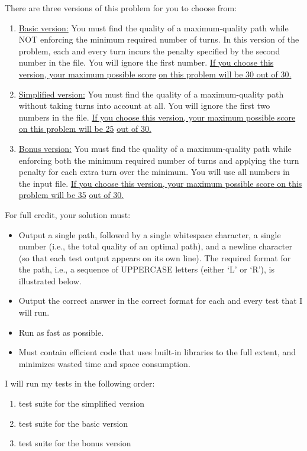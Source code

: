 \documentclass[12pt]{article}
\begin{document}
\begin{enumerate}
{There are three versions of this problem for you to choose from:
\begin{enumerate}
\item \underline{Basic version:} You must find the  quality of a maximum-quality
  path while NOT enforcing the minimum required number of turns. In this
  version of the problem, each and every turn incurs the penalty
  specified by the second number in the file. You will ignore the
  first number. \underline{If you choose this version, your maximum possible
    score}
  \underline{on this problem will be 30 out of 30.}
\item \underline{Simplified version:} You must find the quality of a
  maximum-quality path without taking turns into account at all. You
  will ignore the first two numbers in the file. \underline{If you
    choose this version, your maximum possible score on this problem will
    be 25}
    \underline{out of 30.}
\item \underline{Bonus version:} You must find the quality of a maximum-quality
  path while enforcing both the minimum required number of turns and
  applying the turn penalty for each extra turn over the minimum. You
  will use all numbers in the input file. \underline{If you
    choose this version, your maximum possible score on this problem will
    be 35}
  \underline{out of 30.}
\end{enumerate}

For full credit, your solution must:
\begin{itemize}
\item Output a single path, followed by a single whitespace character, a single
  number (i.e., the total quality of an optimal path), and a newline
  character (so that each test output appears on its own line). The
  required format for the path, i.e., a  sequence of UPPERCASE letters
  (either `L' or `R'), is illustrated below.
\item Output the correct answer in the correct format for each and
  every test that I will run.
\item Run as fast as possible.
\item Must contain efficient code that uses built-in libraries to
  the full extent, and minimizes wasted time and space consumption.
\end{itemize}

I will run my tests in the following order:
\begin{enumerate}
\item test suite for the simplified version
\item test suite  for the basic version
\item test suite  for the bonus version
\end{enumerate}

}
\end{enumerate}
\end{document}
